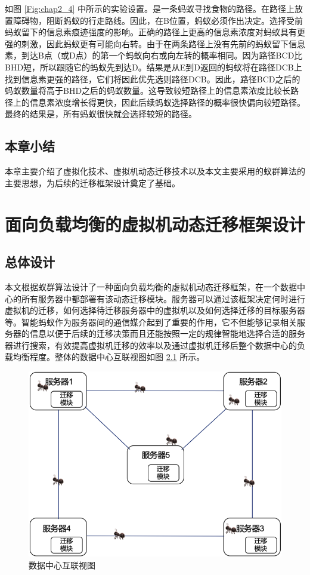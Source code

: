 如图 \ref{Fig:chap2_4} 中所示的实验设置。是一条蚂蚁寻找食物的路径。在路径上放置障碍物，阻断蚂蚁的行走路线。因此，在B位置，蚂蚁必须作出决定。选择受前蚂蚁留下的信息素痕迹强度的影响。正确的路径上更高的信息素浓度对蚂蚁具有更强的刺激，因此蚂蚁更有可能向右转。由于在两条路径上没有先前的蚂蚁留下信息素，到达B点（或D点）的第一个蚂蚁向右或向左转的概率相同。因为路径BCD比BHD短，所以跟随它的蚂蚁先到达D。结果是从E到D返回的蚂蚁将在路径DCB上找到信息素更强的路径，它们将因此优先选则路径DCB。因此，路径BCD之后的蚂蚁数量将高于BHD之后的蚂蚁数量。这导致较短路径上的信息素浓度比较长路径上的信息素浓度增长得更快，因此后续蚂蚁选择路径的概率很快偏向较短路径。最终的结果是，所有蚂蚁很快就会选择较短的路径。

\section{本章小结}
本章主要介绍了虚拟化技术、虚拟机动态迁移技术以及本文主要采用的蚁群算法的主要思想，为后续的迁移框架设计奠定了基础。

\chapter{面向负载均衡的虚拟机动态迁移框架设计}

\section{总体设计}
本文根据蚁群算法设计了一种面向负载均衡的虚拟机动态迁移框架，在一个数据中心的所有服务器中都部署有该动态迁移模块。服务器可以通过该框架决定何时进行虚拟机的迁移，如何选择待迁移服务器中的虚拟机以及如何选择迁移的目标服务器等。智能蚂蚁作为服务器间的通信媒介起到了重要的作用，它不但能够记录相关服务器的信息以便于后续的迁移决策而且还能按照一定的规律智能地选择合适的服务器进行搜索，有效提高虚拟机迁移的效率以及通过虚拟机迁移后整个数据中心的负载均衡程度。整体的数据中心互联视图如图 \ref{Fig:chap3_1} 所示。

\begin{figure}[htb]
  \centering
  \includegraphics{./Figure/IMG_Chap3_1.png}
  \caption{数据中心互联视图}\label{Fig:chap3_1}
\end{figure}

